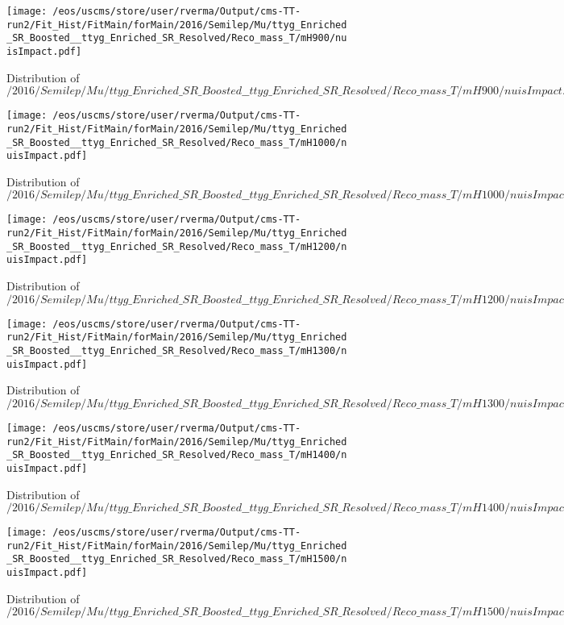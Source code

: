\begin{figure}
\centering
\texttt{[image: /eos/uscms/store/user/rverma/Output/cms-TT-run2/Fit\_Hist/FitMain/forMain/2016/Semilep/Mu/ttyg\_Enriched\_SR\_Boosted\_\_ttyg\_Enriched\_SR\_Resolved/Reco\_mass\_T/mH900/nuisImpact.pdf]}
\caption{Distribution of $/2016/Semilep/Mu/ttyg\_Enriched\_SR\_Boosted\_\_ttyg\_Enriched\_SR\_Resolved/Reco\_mass\_T/mH900/nuisImpact.pdf$}
\end{figure}

\begin{figure}
\centering
\texttt{[image: /eos/uscms/store/user/rverma/Output/cms-TT-run2/Fit\_Hist/FitMain/forMain/2016/Semilep/Mu/ttyg\_Enriched\_SR\_Boosted\_\_ttyg\_Enriched\_SR\_Resolved/Reco\_mass\_T/mH1000/nuisImpact.pdf]}
\caption{Distribution of $/2016/Semilep/Mu/ttyg\_Enriched\_SR\_Boosted\_\_ttyg\_Enriched\_SR\_Resolved/Reco\_mass\_T/mH1000/nuisImpact.pdf$}
\end{figure}

\begin{figure}
\centering
\texttt{[image: /eos/uscms/store/user/rverma/Output/cms-TT-run2/Fit\_Hist/FitMain/forMain/2016/Semilep/Mu/ttyg\_Enriched\_SR\_Boosted\_\_ttyg\_Enriched\_SR\_Resolved/Reco\_mass\_T/mH1200/nuisImpact.pdf]}
\caption{Distribution of $/2016/Semilep/Mu/ttyg\_Enriched\_SR\_Boosted\_\_ttyg\_Enriched\_SR\_Resolved/Reco\_mass\_T/mH1200/nuisImpact.pdf$}
\end{figure}

\begin{figure}
\centering
\texttt{[image: /eos/uscms/store/user/rverma/Output/cms-TT-run2/Fit\_Hist/FitMain/forMain/2016/Semilep/Mu/ttyg\_Enriched\_SR\_Boosted\_\_ttyg\_Enriched\_SR\_Resolved/Reco\_mass\_T/mH1300/nuisImpact.pdf]}
\caption{Distribution of $/2016/Semilep/Mu/ttyg\_Enriched\_SR\_Boosted\_\_ttyg\_Enriched\_SR\_Resolved/Reco\_mass\_T/mH1300/nuisImpact.pdf$}
\end{figure}

\begin{figure}
\centering
\texttt{[image: /eos/uscms/store/user/rverma/Output/cms-TT-run2/Fit\_Hist/FitMain/forMain/2016/Semilep/Mu/ttyg\_Enriched\_SR\_Boosted\_\_ttyg\_Enriched\_SR\_Resolved/Reco\_mass\_T/mH1400/nuisImpact.pdf]}
\caption{Distribution of $/2016/Semilep/Mu/ttyg\_Enriched\_SR\_Boosted\_\_ttyg\_Enriched\_SR\_Resolved/Reco\_mass\_T/mH1400/nuisImpact.pdf$}
\end{figure}

\begin{figure}
\centering
\texttt{[image: /eos/uscms/store/user/rverma/Output/cms-TT-run2/Fit\_Hist/FitMain/forMain/2016/Semilep/Mu/ttyg\_Enriched\_SR\_Boosted\_\_ttyg\_Enriched\_SR\_Resolved/Reco\_mass\_T/mH1500/nuisImpact.pdf]}
\caption{Distribution of $/2016/Semilep/Mu/ttyg\_Enriched\_SR\_Boosted\_\_ttyg\_Enriched\_SR\_Resolved/Reco\_mass\_T/mH1500/nuisImpact.pdf$}
\end{figure}

